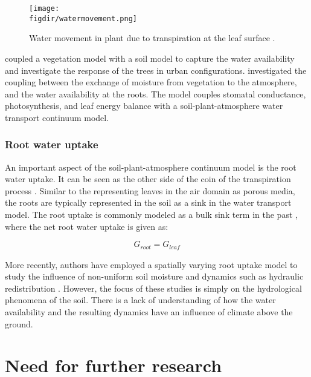 	 \begin{figure}[t]
	 	\centering
	 	\texttt{[image: \\figdir/watermovement.png]}
	 	\caption{Water movement in plant due to transpiration at the leaf surface \citep{Sawinski2011}.}
	 	\label{fig:watermovement}
	 \end{figure}

\cite{Bruse1998} coupled a vegetation model with a soil model to capture the water availability and investigate the response of the trees in urban configurations. \cite{Tuzet2003} investigated the coupling between the exchange of moisture from vegetation to the atmosphere, and the water availability at the roots. The model couples stomatal conductance, photosynthesis, and leaf energy balance with a soil-plant-atmosphere water transport continuum model. 

\subsubsection*{Root water uptake}

An important aspect of the soil-plant-atmosphere continuum model is the root water uptake. It can be seen as the other side of the coin of the transpiration process \citep{Clark2015}. Similar to the representing leaves in the air domain as porous media, the roots are typically represented in the soil as a sink in the water transport model. The root uptake is commonly modeled as a bulk sink term in the past \citep{Hopmans2002,Vrugt2001}, where the net root water uptake is given as:
	 
	 \begin{equation}
	 G_{\textit{root}} = G_{\textit{leaf}}
	 \end{equation}
	 
More recently, authors have employed a spatially varying root uptake model to study the influence of non-uniform soil moisture and dynamics such as hydraulic redistribution \citep{Volpe2013,Manoli2014a,Huang2017, Lai2000, Manoli2014}. However, the focus of these studies is simply on the hydrological phenomena of the soil. There is a lack of understanding of how the water availability and the resulting dynamics have an influence of climate above the ground. 
	
\section{Need for further research}

